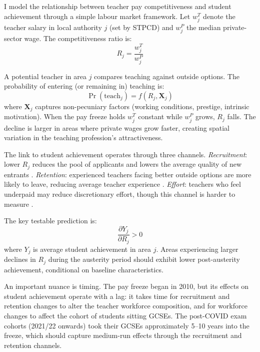 \documentclass[12pt]{article}
\begin{document}
I model the relationship between teacher pay competitiveness and student achievement through a simple labour market framework. Let $w_j^T$ denote the teacher salary in local authority $j$ (set by STPCD) and $w_j^P$ the median private-sector wage. The competitiveness ratio is:
\begin{equation}
R_j = \frac{w_j^T}{w_j^P}
\end{equation}

A potential teacher in area $j$ compares teaching against outside options. The probability of entering (or remaining in) teaching is:
\begin{equation}
\Pr(\text{teach}_j) = f(R_j, \mathbf{X}_j)
\end{equation}
where $\mathbf{X}_j$ captures non-pecuniary factors (working conditions, prestige, intrinsic motivation). When the pay freeze holds $w_j^T$ constant while $w_j^P$ grows, $R_j$ falls. The decline is larger in areas where private wages grow faster, creating spatial variation in the teaching profession's attractiveness.

The link to student achievement operates through three channels. \textit{Recruitment}: lower $R_j$ reduces the pool of applicants and lowers the average quality of new entrants \citep{hanushek2011economic}. \textit{Retention}: experienced teachers facing better outside options are more likely to leave, reducing average teacher experience \citep{gilpin2011reevaluating, imazeki2005does}. \textit{Effort}: teachers who feel underpaid may reduce discretionary effort, though this channel is harder to measure \citep{jackson2018does}.

The key testable prediction is:
\begin{equation}
\frac{\partial Y_j}{\partial R_j} > 0
\end{equation}
where $Y_j$ is average student achievement in area $j$. Areas experiencing larger declines in $R_j$ during the austerity period should exhibit lower post-austerity achievement, conditional on baseline characteristics.

An important nuance is timing. The pay freeze began in 2010, but its effects on student achievement operate with a lag: it takes time for recruitment and retention changes to alter the teacher workforce composition, and for workforce changes to affect the cohort of students sitting GCSEs. The post-COVID exam cohorts (2021/22 onwards) took their GCSEs approximately 5--10 years into the freeze, which should capture medium-run effects through the recruitment and retention channels.
\end{document}
